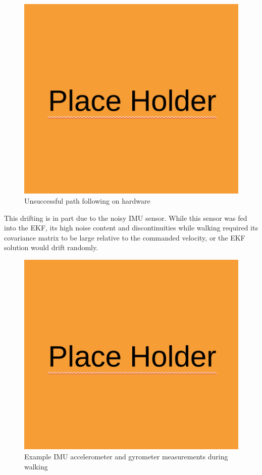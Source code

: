 \begin{figure}[H]
    \centerline{\includegraphics[scale=0.25]{place_holder.png}}
    \caption{Unsuccessful path following on hardware}
    \label{fig:hardware_path_following}
\end{figure}

This drifting is in part due to the noisy IMU sensor. While this sensor was fed into the EKF, its high noise content and discontinuities while walking required its covariance matrix to be large relative to the commanded velocity, or the EKF solution would drift randomly. 

\begin{figure}[H]
    \centerline{\includegraphics[scale=0.25]{place_holder.png}}
    \caption{Example IMU accelerometer and gyrometer measurements during walking}
    \label{fig:imu_data}
\end{figure}

